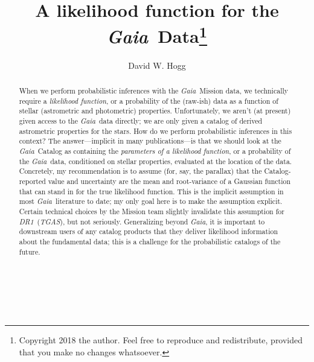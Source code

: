 \documentclass[12pt, modern]{aastex62h}
\newcommand{\acronym}[1]{{\small{#1}}}
\newcommand{\Gaia}{\textsl{Gaia}}
\newcommand{\DRone}{\textsl{\acronym{DR1}}}
\newcommand{\TGAS}{\textsl{\acronym{TGAS}}}
\begin{document}
\sloppy\sloppypar\raggedbottom\frenchspacing

\noindent
\title{A likelihood function for the \Gaia\ Data\footnote{%
  Copyright 2018 the author. Feel free to reproduce and redistribute, provided
  that you make no changes whatsoever.}}

\author[0000-0003-2866-9403]{David W. Hogg}

\begin{abstract}\noindent
When we perform probabilistic inferences with the \Gaia\ Mission data,
we technically require
a \emph{likelihood function}, or a probability of the (raw-ish) data as a function
of stellar (astrometric and photometric) properties.
Unfortunately, we aren't (at present) given access to the \Gaia\ data
directly;
we are only given a catalog of derived astrometric properties for the stars.
How do we perform probabilistic inferences in this context?
The answer---implicit in many publications---is that we should look at the
\Gaia\ Catalog as containing the \emph{parameters of a likelihood function}, or
a probability of the \Gaia\ data, conditioned on stellar properties,
evaluated at the location of the data.
Concretely, my recommendation is to assume
(for, say, the parallax) that the Catalog-reported
value and uncertainty are the mean and root-variance of a Gaussian
function that can stand in for the true likelihood function.
This is the implicit assumption in most \Gaia\ literature to date;
my only goal here is to make the assumption explicit.
Certain technical choices by the Mission team slightly invalidate
this assumption for \DRone\ (\TGAS), but not seriously. Generalizing beyond \Gaia,
it is important to downstream users of any catalog products
that they deliver likelihood information about the fundamental data;
this is a challenge for the probabilistic catalogs of the future.
\end{abstract}


\section*{~}\clearpage
\end{document}
